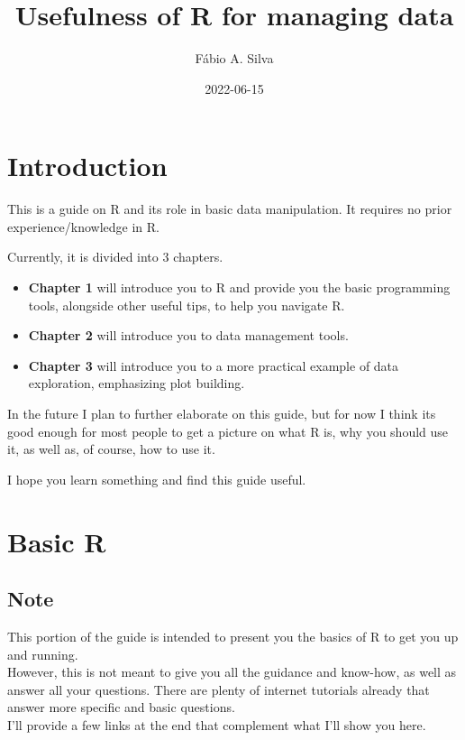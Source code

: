 \documentclass[
]{book}
\title{Usefulness of R for managing data}
\author{Fábio A. Silva}
\date{2022-06-15}
\begin{document}
\maketitle

{
\setcounter{tocdepth}{1}
\tableofcontents
}
\hypertarget{introduction}{%
\chapter{Introduction}\label{introduction}}

This is a guide on R and its role in basic data manipulation.
It requires no prior experience/knowledge in R.

Currently, it is divided into 3 chapters.

\begin{itemize}
\item
  \textbf{Chapter 1} will introduce you to R and provide you the basic programming tools, alongside other useful tips, to help you navigate R.
\item
  \textbf{Chapter 2} will introduce you to data management tools.
\item
  \textbf{Chapter 3} will introduce you to a more practical example of data exploration, emphasizing plot building.
\end{itemize}

In the future I plan to further elaborate on this guide, but for now I think its good enough for most people to get a picture on what R is, why you should use it, as well as, of course, how to use it.

I hope you learn something and find this guide useful.

\hypertarget{basic-r}{%
\chapter{Basic R}\label{basic-r}}

\hypertarget{note}{%
\section{Note}\label{note}}

This portion of the guide is intended to present you the basics of R to get you up and running.\\
However, this is not meant to give you all the guidance and know-how, as well as answer all your questions.
There are plenty of internet tutorials already that answer more specific and basic questions.\\
I'll provide a few links at the end that complement what I'll show you here.
\end{document}
